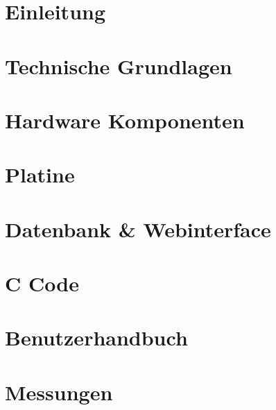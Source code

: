 \documentclass[a4paper,oneside,12pt,titlepage]{scrartcl}   %
\begin{document}
\newpage
\section{Einleitung}

\newpage
\section{Technische Grundlagen}

\newpage
\section{Hardware Komponenten}

\newpage
\section{Platine}

\newpage
\section{Datenbank \& Webinterface}

\newpage
\section{C Code}

\newpage
\section{Benutzerhandbuch}

\newpage
\section{Messungen}

\newpage
\end{document}
